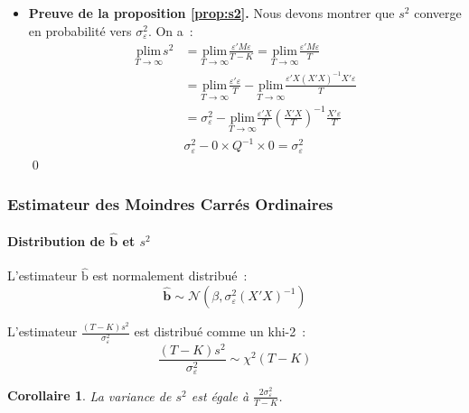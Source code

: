 \documentclass[10pt]{beamer}
\theoremstyle{plain}
\newtheorem{cor}{Corollaire}
\begin{document}
\begin{notes}
\begin{itemize}
\item \textbf{Preuve de la proposition \ref{prop:s2}.} Nous devons montrer que $s^2$ converge en probabilité vers $\sigma_{\varepsilon}^2$. On a~:
  \[
    \begin{split}
      \underset{T\to\infty}{\mathrm{plim}} s^2 &= \underset{T\to\infty}{\mathrm{plim}} \frac{\varepsilon' M \varepsilon}{T-K} = \underset{T\to\infty}{\mathrm{plim}} \frac{\varepsilon' M \varepsilon}{T}\\
                                               &= \underset{T\to\infty}{\mathrm{plim}} \frac{\varepsilon' \varepsilon}{T} - \underset{T\to\infty}{\mathrm{plim}} \frac{\varepsilon' X (X'X)^{-1}X'\varepsilon}{T}\\
                                               &= \sigma_{\varepsilon}^2 - \underset{T\to\infty}{\mathrm{plim}} \frac{\varepsilon'X}{T}\left( \frac{X'X}{T} \right)^{-1}\frac{X'\varepsilon}{T}\\
      & \sigma_{\varepsilon}^2 - 0 \times Q^{-1} \times 0 = \sigma_{\varepsilon}^2
    \end{split}
  \]
\qed
\end{itemize}
\end{notes}


\begin{frame}
  \frametitle{Estimateur des Moindres Carrés Ordinaires}
  \framesubtitle {Distribution de $\hat{\mathbf b}$ et $s^2$}

  \begin{theorem}\label{thm:bhat:distribution}
    L'estimateur $\hat{\mathrm b}$ est normalement distribué~:
    \[
      \hat{\mathbf b} \sim \mathcal N\left( \beta, \sigma_{\varepsilon}^2(X'X)^{-1} \right)
    \]
  \end{theorem}


  \begin{theorem}\label{thm:s2:distribution}
    L'estimateur $\frac{(T-K)s^2}{\sigma_{\varepsilon}^2}$ est distribué comme un khi-2~:
    \[
      \frac{(T-K)s^2}{\sigma_{\varepsilon}^2} \sim \chi^2(T-K)
    \]
  \end{theorem}


  \begin{cor}\label{cor:s2:distribution}
    La variance de $s^2$ est égale à $\frac{2\sigma_{\varepsilon}^2}{T-K}$.
  \end{cor}

\end{frame}
\end{document}
